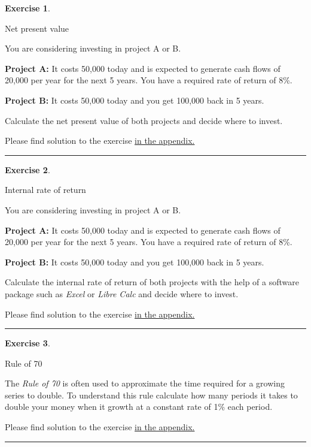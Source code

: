 \documentclass[
  12pt,
  oneside]{book}
\theoremstyle{definition}
\theoremstyle{definition}
\theoremstyle{definition}
\newtheorem{exercise}{Exercise}[chapter]
\theoremstyle{definition}
\theoremstyle{remark}
\begin{document}
\begin{exercise}
\protect\hypertarget{exr:netpresentvalue}{}\label{exr:netpresentvalue}

Net present value

You are considering investing in project A or B.

\textbf{Project A:} It costs 50,000 today and is expected to generate cash flows of 20,000 per year for the next 5 years. You have a required rate of return of 8\%.

\textbf{Project B:} It costs 50,000 today and you get 100,000 back in 5 years.

Calculate the net present value of both projects and decide where to invest.

Please find solution to the exercise \hyperref[sol:netpresentvalue]{in the appendix.}

\begin{center}\rule{0.5\linewidth}{0.5pt}\end{center}

\end{exercise}

\begin{exercise}
\protect\hypertarget{exr:irr}{}\label{exr:irr}

Internal rate of return

You are considering investing in project A or B.

\textbf{Project A:} It costs 50,000 today and is expected to generate cash flows of 20,000 per year for the next 5 years. You have a required rate of return of 8\%.

\textbf{Project B:} It costs 50,000 today and you get 100,000 back in 5 years.

Calculate the internal rate of return of both projects with the help of a software package such as \emph{Excel} or \emph{Libre Calc} and decide where to invest.

Please find solution to the exercise \hyperref[sol:irr]{in the appendix.}

\begin{center}\rule{0.5\linewidth}{0.5pt}\end{center}

\end{exercise}

\begin{exercise}
\protect\hypertarget{exr:rule70}{}\label{exr:rule70}

Rule of 70

The \emph{Rule of 70} is often used to approximate the time required for a growing series to double. To understand this rule calculate how many periods it takes to double your money when it growth at a constant rate of 1\% each period.

Please find solution to the exercise \hyperref[sol:rule70]{in the appendix.}

\begin{center}\rule{0.5\linewidth}{0.5pt}\end{center}

\end{exercise}
\end{document}
